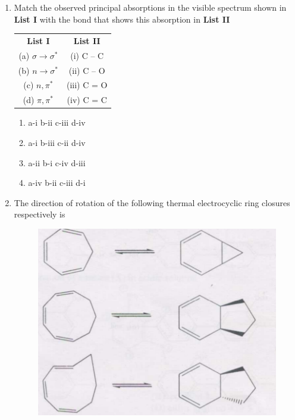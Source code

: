 \documentclass[journal,12pt,onecolumn]{IEEEtran}
\theoremstyle{remark}
\begin{document}
\begin{enumerate}
   

\item  Match the observed principal absorptions in the visible spectrum shown in \textbf{List I} with the bond that shows this absorption in \textbf{List II} \hfill{}

\begin{center}
\begin{tabular}{c@{\hspace{3cm}}c}
\textbf{List I} & \textbf{List II} \\
(a) $\sigma \rightarrow \sigma^*$ & (i) C -- C \\
(b) $n \rightarrow \sigma^*$ & (ii) C -- O \\
(c) $n, \pi^*$ & (iii) C = O \\
(d) $\pi, \pi^*$ & (iv) C = C \\
\end{tabular}
\end{center}

\begin{multicols}{2}
\begin{enumerate}
     \item   a-i \quad b-ii \quad c-iii \quad d-iv
     \item   a-i \quad b-iii \quad c-ii \quad d-iv
     \item   a-ii \quad b-i \quad c-iv \quad d-iii
     \item   a-iv \quad b-ii \quad c-iii \quad d-i
\end{enumerate}
\end{multicols}
   

\item  The direction of rotation of the following thermal electrocyclic ring closures respectively is \hfill{}
\begin{figure}
    \centering
    \includegraphics[width=0.5\columnwidth]{figs/image8.png}
    \caption{}
    \label{fig:figure8}
\end{figure}




\end{enumerate}
\end{document}
